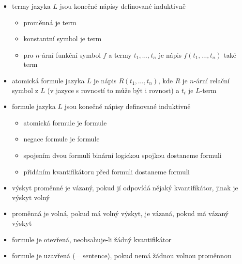 \begin{itemize}
\begin{itemize}
\begin{itemize}
\begin{itemize}
\item $A$ je neprázdná množina, říkáme jí doména (také universum)
\item $\mathcal {R^A}$ je množina interpretací jednotlivých relačních symbolů (kde interpretace $n$-árního relačního symbolu je množina uspořádaných $n$-tic prvků z $A$)
\item $\mathcal {F^A}$ je množina interpretací jednotlivých funkčních symbolů (kde intepretace $n$-árního funkčního symbolu odpovídá funkci přiřazující $n$-tici prvků z $A$ jeden prvek z $A$)
\begin{itemize}
\item speciálně pro konstantní symbol $c\in\mathcal F$ je $c^\mathcal A\in A$
\end{itemize}
\end{itemize}
\item termy jazyka $L$ jsou konečné nápisy definované induktivně
\begin{itemize}
\item proměnná je term
\item konstantní symbol je term
\item pro $n$-ární funkční symbol $f$ a termy $t_1,\dots,t_n$ je nápis $f(t_1,\dots,t_n)$ také term
\end{itemize}
\item atomická formule jazyka $L$ je nápis $R(t_1,\dots,t_n)$, kde $R$ je $n$-ární relační symbol z $L$ (v jazyce s rovností to může být i rovnost) a $t_i$ je $L$-term
\item formule jazyka $L$ jsou konečné nápisy definované induktivně
\begin{itemize}
\item atomická formule je formule
\item negace formule je formule
\item spojením dvou formulí binární logickou spojkou dostaneme formuli
\item přidáním kvantifikátoru před formuli dostaneme formuli
\end{itemize}
\item výskyt proměnné je vázaný, pokud jí odpovídá nějaký kvantifikátor, jinak je výskyt volný
\item proměnná je volná, pokud má volný výskyt, je vázaná, pokud má vázaný výskyt
\item formule je otevřená, neobsahuje-li žádný kvantifikátor
\item formule je uzavřená (= sentence), pokud nemá žádnou volnou proměnnou

\end{itemize}
\end{itemize}
\end{itemize}
